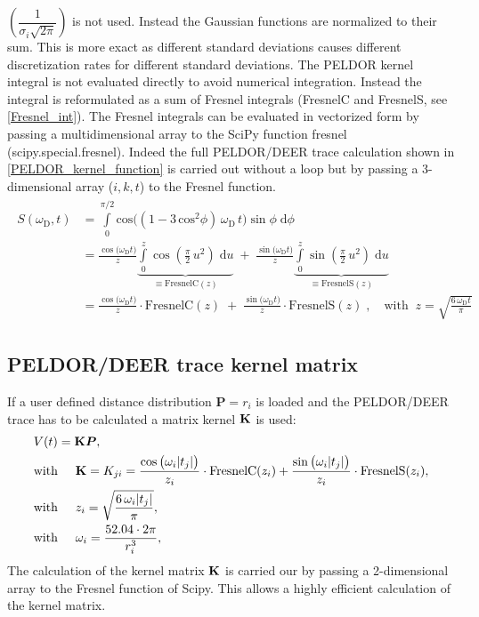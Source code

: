 \documentclass[pdftex,bezier,german,a4,twoside, headexclude,12pt,nochapterprefix, titlepage]{extarticle}
\begin{document}
$\left(\dfrac{1}{\sigma_i \sqrt{2\pi}}\right)$ is not used. Instead the Gaussian functions are normalized to their sum. This is more exact as 
different standard deviations causes different discretization rates for different standard deviations. The PELDOR kernel integral is
not evaluated directly to avoid numerical integration. Instead the integral is reformulated as a sum of Fresnel integrals (FresnelC and FresnelS, see \autoref{Fresnel_int}). The Fresnel integrals can be evaluated in vectorized form by passing a multidimensional array to the SciPy function
fresnel (scipy.special.fresnel). Indeed the full PELDOR/DEER trace calculation shown in \autoref{PELDOR_kernel_function}
is carried out without a loop but by passing a 3-dimensional array ($i,k,t$) to the Fresnel function.
\begin{eqnarray}
\begin{split}
S(\omega_{\text{D}},t) & = \int\limits_{0}^{\pi/2}\mathrm{cos}\Big((1-3\,\mathrm{cos}^2\phi)\,\omega_{\text{D}}\,t\Big)\sin \phi\; \text{d}\phi \\ 
   & = 
   \frac{\cos{\big(\omega_{\text{D}}t \big)}}{z} 
   \underbrace{\int\limits_{0}^{z} \cos{\left( \frac{\pi}{2}\,u^{2} \right)} 
   \;\text{d}u}_{\equiv \text{FresnelC}(z)} \; + \; 
   \frac{\sin{\big(\omega_{\text{D}} t \big)}}{z}
   \underbrace{\int\limits_{0}^{z} 
   \sin{\left( \frac{\pi}{2}\,u^{2} \right)}\;\text{d}u}_{\equiv \text{FresnelS}(z)}      
\label{eqFresnel08} \\[2mm]
   & =  \frac{\cos{\big(\omega_{\text{D}}t \big)}}{z} \cdot \text{FresnelC}(z) \; + \;
   \frac{\sin{\big(\omega_{\text{D}} t\big)}}{z} \cdot \text{FresnelS}(z)\; ,
   \quad\text{with}\;\; z = \sqrt{\frac{6\,\omega_{\text{D}} t }{\pi}}
\label{eqFresnel09}  
\end{split}
\label{Fresnel_int}
\end{eqnarray}
\subsection{PELDOR/DEER trace kernel matrix}
If a user defined distance distribution $\boldsymbol{P} = r_{i}$ is loaded and the PELDOR/DEER trace has to be calculated a 
matrix kernel $\bold{K}$ is used:
\begin{align}
\begin{split}
&V(t) = \bold{K}\boldsymbol{P},\\
&\mbox{with}\hspace{0.5cm} \bold{K} = K_{ji} =
\frac{\cos{\big(\omega_{i}|t_j| \big)}}{z_{i}} \cdot \text{FresnelC}(z_{i})  + 
   \frac{\sin{\big(\omega_{i} |t_j|\big)}}{z_{i}} \cdot \text{FresnelS}(z_{i}),\\
  &\mbox{with}\hspace{0.5cm}  z_{i} = \sqrt{\frac{6\,\omega_{i} |t_j| }{\pi}},\\
&\mbox{with}\hspace{0.5cm} \omega_{i} = \dfrac{52.04\cdot 2 \pi}{r_{i}^3},\\ 
\label{kernel_matrix_cal}
\end{split}
\end{align}
The calculation of the kernel matrix $\bold{K}$ is carried our by passing a 2-dimensional array to the Fresnel function of Scipy. This allows a highly efficient calculation of the kernel matrix.
\end{document}
